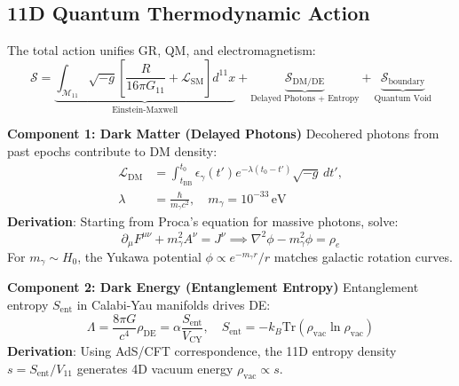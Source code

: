 \documentclass[12pt, a4paper]{article}
\begin{document}
\subsection{11D Quantum Thermodynamic Action}  
\label{subsec:action}  
The total action unifies GR, QM, and electromagnetism:  
\begin{equation}  
\mathcal{S} = \underbrace{\int_{\mathcal{M}_{11}} \sqrt{-g} \left[ \frac{R}{16\pi G_{11}} + \mathcal{L}_{\text{SM}} \right] d^{11}x}_{\text{Einstein-Maxwell}} + \underbrace{\mathcal{S}_{\text{DM/DE}}}_{\text{Delayed Photons + Entropy}} + \underbrace{\mathcal{S}_{\text{boundary}}}_{\text{Quantum Void}}  
\label{eq:total_action}  
\end{equation}  

\textbf{Component 1: Dark Matter (Delayed Photons)}  
Decohered photons from past epochs contribute to DM density:  
\begin{align}  
\mathcal{L}_{\text{DM}} &= \int_{t_{\text{BB}}}^{t_0} \epsilon_\gamma(t') e^{-\lambda(t_0 - t')} \sqrt{-g} \, dt', \\  
\lambda &= \frac{\hbar}{m_\gamma c^2}, \quad m_\gamma = 10^{-33} \, \text{eV}  
\label{eq:dm_lagrangian}  
\end{align}  
\textbf{Derivation}: Starting from Proca's equation for massive photons, solve:  
\begin{equation}  
\partial_\mu F^{\mu\nu} + m_\gamma^2 A^\nu = J^\nu \implies \nabla^2 \phi - m_\gamma^2 \phi = \rho_e  
\label{eq:proca}  
\end{equation}  
For \( m_\gamma \sim H_0 \), the Yukawa potential \( \phi \propto e^{-m_\gamma r}/r \) matches galactic rotation curves.  

\textbf{Component 2: Dark Energy (Entanglement Entropy)}  
Entanglement entropy \( S_{\text{ent}} \) in Calabi-Yau manifolds drives DE:  
\begin{equation}  
\Lambda = \frac{8\pi G}{c^4} \rho_{\text{DE}} = \alpha \frac{S_{\text{ent}}}{V_{\text{CY}}}, \quad S_{\text{ent}} = -k_B \text{Tr}(\rho_{\text{vac}} \ln \rho_{\text{vac}})  
\label{eq:de}  
\end{equation}  
\textbf{Derivation}: Using AdS/CFT correspondence, the 11D entropy density \( s = S_{\text{ent}}/V_{11} \) generates 4D vacuum energy \( \rho_{\text{vac}} \propto s \).  

\end{document}

